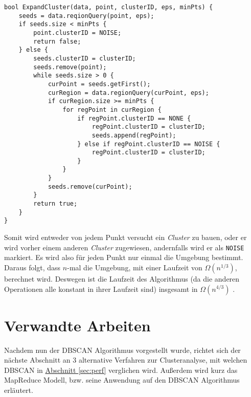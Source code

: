 \documentclass{lni}
\begin{document}

\newpage

\begin{lstlisting}[caption={ExpandCluster Methode in Anlehnung an \cite{DBSCAN}},label={lst:expcluster}]
bool ExpandCluster(data, point, clusterID, eps, minPts) {
    seeds = data.reqionQuery(point, eps);
    if seeds.size < minPts {
        point.clusterID = NOISE;
        return false;
    } else {
        seeds.clusterID = clusterID;
        seeds.remove(point);
        while seeds.size > 0 {
            curPoint = seeds.getFirst();
            curRegion = data.regionQuery(curPoint, eps);
            if curRegion.size >= minPts {
                for regPoint in curRegion {
                    if regPoint.clusterID == NONE {
                        regPoint.clusterID = clusterID;
                        seeds.append(regPoint);
                    } else if regPoint.clusterID == NOISE {
                        regPoint.clusterID = clusterID;
                    }
                }
            }
            seeds.remove(curPoint);
        }
        return true;
    }
}
\end{lstlisting}


Somit wird entweder von jedem Punkt versucht ein \textit{Cluster} zu bauen, oder er wird vorher einem anderen \textit{Cluster} zugewiesen, andernfalls wird er als \lstinline{NOISE} markiert. Es wird also für jeden Punkt nur einmal die Umgebung bestimmt. Daraus folgt, dass $n$-mal die Umgebung, mit einer Laufzeit von $\Omega(n^{1/3})$, berechnet wird. Deswegen ist die Laufzeit des Algorithmus (da die anderen Operationen alle konstant in ihrer Laufzeit sind) insgesamt in $\Omega(n^{4/3})$ \cite{REV}. 

%
%

\newpage

\section{Verwandte Arbeiten}
\label{sec:related}
Nachdem nun der DBSCAN Algorithmus vorgestellt wurde, richtet sich der nächste Abschnitt an 3 alternative Verfahren zur Clusteranalyse, mit welchen DBSCAN in \hyperref[sec:perf]{Abschnitt \ref{sec:perf}} verglichen wird. Außerdem wird kurz das MapReduce Modell, bzw. seine Anwendung auf den DBSCAN Algorithmus erläutert.

\end{document}

